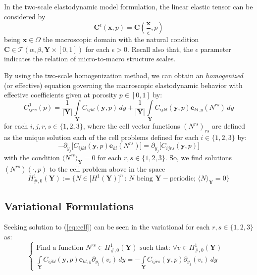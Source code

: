 \begin{rem}
In the two-scale elastodynamic model formulation, the linear elastic tensor can be considered by
\begin{equation*}
    \mathbf{C}^{\epsilon}(\mathbf{x},p) = \mathbf{C}(\frac{\mathbf{x}}{\epsilon},p)
\end{equation*} being $\mathbf{x}\in \Omega$ the macroscopic domain with the natural condition $\mathbf{C} \in \mathcal{T}(\alpha, \beta, \mathbf{Y}\times [0,1])$ for each $\epsilon >0$. Recall also that, the $\epsilon$ parameter indicates the relation of micro-to-macro structure scales.
\end{rem}
By using the two-scale homogenization method, we can obtain an \textit{homogenized} (or effective) equation governing the macroscopic elastodynamic behavior with effective coefficients given at porosity $p \in [0,1]$ by:
\begin{equation*}
    C^0_{ijrs}(p) = \frac{1}{\vert \mathbf{Y}\vert} \int\limits_{\mathbf{Y}} C_{ijkl}(\mathbf{y},p) \, dy + \frac{1}{\vert \mathbf{Y}\vert} \int\limits_{\mathbf{Y}} C_{ijkl}(\mathbf{y},p) \mathbf{e}_{kl,y}( N^{rs})\,dy
\end{equation*}
for each $ i,j,r,s \in \{1,2,3\}$, where the cell vector functions $(N^{rs})_{rs}$ are defined as the unique solution each of the cell problems defined for each $i \in \{1,2,3\}$ by:
\begin{equation}
    \label{eq:cell}
    -\partial_{y_j} \big[ C_{ijkl}(\mathbf{y},p) \mathbf{e}_{kl}(N^{rs}) \big] = \partial_{y_j} \big[ C_{ijrs}(\mathbf{y},p) \big] 
\end{equation}
with the condition $\langle N^{rs} \rangle_{\mathbf{Y}} = 0$ for each $r,s \in \{1,2,3\}$.
So, we find solutions $(N^{rs})(\cdot,p)$ to the cell problem above in the space
\begin{equation*}
    H^1_{\#, 0} (\mathbf{Y}) := \big \{ N \in \big[ H^1(\mathbf{Y}) \big]^n \, : \, N \text{ being } \mathbf{Y}-\text{periodic}; \, \langle N \rangle_{\mathbf{Y}}=0 \big \}
\end{equation*}
\subsection{Variational Formulations}
Seeking solution to (\ref{eq:cell}) can be seen in the variational for each $r,s \in \{1,2,3\}$ as:
\begin{equation}
    \label{eq:cell_variational}
    \left \{
    \begin{array}{cc}
        \text{Find a function } N^{rs} \in H^1_{\#,0}(\mathbf{Y}) \text{ such that: } \forall v \in H^1_{\#, 0}(\mathbf{Y})&\\
        \int\limits_{\mathbf{Y}} C_{ijkl}(\mathbf{y},p)\mathbf{e}_{kl,y} \partial_{y_j}(v_i)\,dy = -\int\limits_{\mathbf{Y}} C_{ijrs}(\mathbf{y},p) \partial_{y_j}(v_i)\,dy & 
    \end{array}
    \right.
\end{equation}

